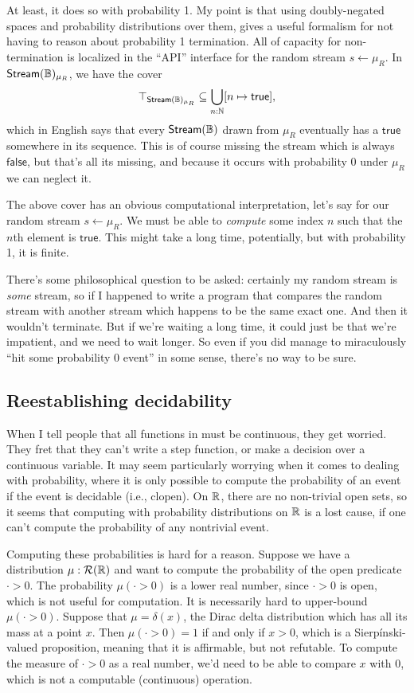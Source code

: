 At least, it does so with probability 1. My point is that using doubly-negated spaces and probability distributions over them, gives a useful formalism for not having to reason about probability 1 termination. All of capacity for non-termination is localized in the ``API'' interface for the random stream $s \leftarrow \mu_R$. In $\mathsf{Stream}(\mathbb{B})_{\mu_R}$, we have the cover
\[
\top_{\mathsf{Stream}(\mathbb{B})_{\mu_R}} \subseteq
  \bigcup_{n : \mathbb{N}} [n \mapsto \mathsf{true}],
\]
which in English says that every $\mathsf{Stream}(\mathbb{B})$ drawn from $\mu_R$ eventually has a $\mathsf{true}$ somewhere in its sequence. This is of course missing the stream which is always $\mathsf{false}$, but that's all its missing, and because it occurs with probability 0 under $\mu_R$ we can neglect it.

The above cover has an obvious computational interpretation, let's say for our random stream $s \leftarrow \mu_R$. We must be able to \emph{compute} some index $n$ such that the $n$th element is $\mathsf{true}$. This might take a long time, potentially, but with probability 1, it is finite.

There's some philosophical question to be asked: certainly my random stream is \emph{some} stream, so if I happened to write a program that compares the random stream with another stream which happens to be the same exact one. And then it wouldn't terminate. But if we're waiting a long time, it could just be that we're impatient, and we need to wait longer. So even if you did manage to miraculously ``hit some probability 0 event'' in some sense, there's no way to be sure.

\subsection{Reestablishing decidability}

When I tell people that all functions in \contpl{} must be continuous, they get worried. They fret that they can't write a step function, or make a decision over a continuous variable. It may seem particularly worrying when it comes to dealing with probability, where it is only possible to compute the probability of an event if the event is decidable (i.e., clopen). On $\mathbb{R}$, there are no non-trivial open sets, so it seems that computing with probability distributions on $\mathbb{R}$ is a lost cause, if one can't compute the probability of any nontrivial event.

Computing these probabilities is hard for a reason. Suppose we have a distribution $\mu : \mathcal{R}(\mathbb{R})$ and want to compute the probability of the open predicate $\cdot > 0$. The probability $\mu(\cdot > 0)$ is a lower real number, since $\cdot > 0$ is open, which is not useful for computation. It is necessarily hard to upper-bound $\mu(\cdot > 0)$. Suppose that $\mu = \delta(x)$, the Dirac delta distribution which has all its mass at a point $x$. Then $\mu(\cdot > 0) = 1$ if and only if $x > 0$, which is a Sierp\'inski-valued proposition, meaning that it is affirmable, but not refutable. To compute the measure of $\cdot > 0$ as a real number, we'd need to be able to compare $x$ with 0, which is not a computable (continuous) operation.

